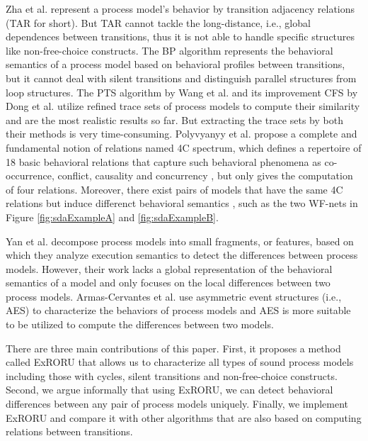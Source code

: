 \documentclass{llncs}
\begin{document}
Zha et al. \cite{zha2010workflow} represent a process model's behavior by transition adjacency relations (TAR for short). But TAR cannot tackle the long-distance, i.e., global dependences between transitions, thus it is not able to handle specific structures like non-free-choice constructs. The BP algorithm \cite{weidlich2011efficient} represents the behavioral semantics of a process model based on behavioral profiles between transitions, but it cannot deal with silent transitions and distinguish parallel structures from loop structures. The PTS algorithm by Wang et al. \cite{wang2010behavioral} and its improvement CFS by Dong et al. \cite{dong2014cfs} utilize refined trace sets of process models to compute their similarity and are the most realistic results so far. But extracting the trace sets by both their methods is very time-consuming. Polyvyanyy et al. \cite{polyvyanyy20144c} propose a complete and fundamental notion of relations named 4C spectrum, which defines a repertoire of 18 basic behavioral relations that capture such behavioral phenomena as co-occurrence, conflict, causality and concurrency \cite{armas2014suitability}, but \cite{polyvyanyy20144c} only gives the computation of four relations. Moreover, there exist pairs of models that have the same 4C relations but induce differenct behavioral semantics \cite{armas2014suitability}, such as the two WF-nets in Figure \ref{fig:sdaExampleA} and \ref{fig:sdaExampleB}.

Yan et al. \cite{yan2014efficient} decompose process models into small fragments, or features, based on which they analyze execution semantics to detect the differences between process models. However, their work lacks a global representation of the behavioral semantics of a model and only focuses on the local differences between two process models. Armas-Cervantes et al. \cite{armas2014behavioral} use asymmetric event structures (i.e., AES) to characterize the behaviors of process models and AES is more suitable to be utilized to compute the differences between two models.

There are three main contributions of this paper. First, it proposes a method called ExRORU that allows us to characterize all types of sound process models including those with cycles, silent transitions and non-free-choice constructs. Second, we argue informally that using ExRORU, we can detect behavioral differences between any pair of process models uniquely. Finally, we implement ExRORU and compare it with other algorithms that are also based on computing relations between transitions.
\end{document}
